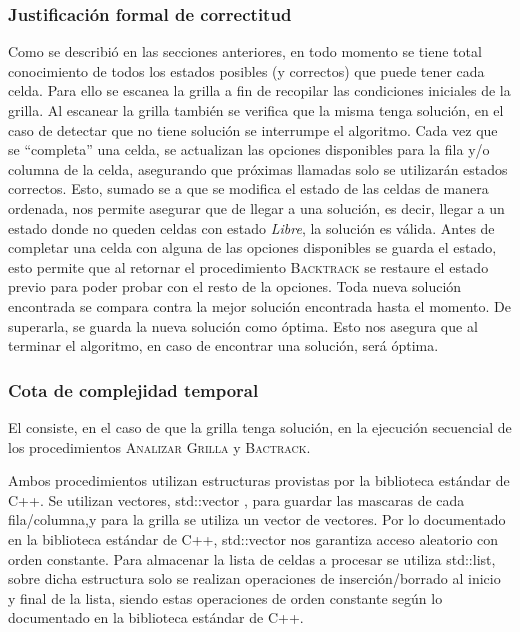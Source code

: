 \documentclass[11pt, a4paper, twoside]{article}
\begin{document}
\clearpage
\subsubsection{Justificación formal de correctitud}

Como se describió en las secciones anteriores, en todo momento se tiene total
conocimiento de todos los estados posibles (y correctos) que puede tener cada celda.
Para ello se escanea la grilla a fin de recopilar las condiciones iniciales de la grilla. 
Al escanear la grilla también se verifica que la misma tenga solución,
en el caso de detectar que no tiene solución se interrumpe el algoritmo.
Cada vez que se \enquote{completa} una celda, se actualizan las opciones
disponibles para la fila y/o columna de la celda, asegurando que próximas
llamadas solo se utilizarán estados correctos. Esto, sumado se a que se modifica
el estado de las celdas de manera ordenada, nos permite asegurar que de llegar a una solución,
es decir, llegar a un estado donde no queden celdas con estado \textit{Libre},
la solución es válida. Antes de completar una celda con alguna de las opciones disponibles
se guarda el estado, esto permite que al retornar el procedimiento \textsc{Backtrack}
se restaure el estado previo para poder probar con el resto de la opciones. 
Toda nueva solución encontrada se compara contra la mejor solución encontrada hasta el momento.
De superarla, se guarda la nueva solución como óptima.
Esto nos asegura que al terminar el algoritmo, en caso de  encontrar una solución, será óptima. 

\subsubsection{Cota de complejidad temporal}

El  consiste, en el caso de que la grilla tenga solución, en la ejecución secuencial de los procedimientos \textsc{Analizar Grilla} y \textsc{Bactrack}. 

Ambos procedimientos utilizan estructuras provistas por la biblioteca estándar de C++. Se utilizan vectores, std::vector , para guardar las mascaras de cada fila/columna,y para la grilla se utiliza un vector de vectores.  Por lo documentado en la biblioteca estándar de C++, std::vector nos garantiza  acceso aleatorio con orden constante.  Para almacenar la lista de celdas a procesar se utiliza std::list, sobre dicha estructura solo se realizan operaciones de inserción/borrado al inicio y final de la lista, siendo estas operaciones de orden constante según lo documentado en la biblioteca estándar de C++.
\end{document}
